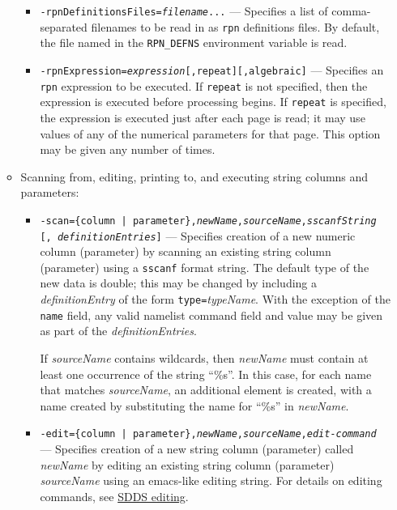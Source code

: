 \begin{itemize}
\begin{itemize}
        \begin{itemize} \item {\tt -rpnDefinitionsFiles={\em filename}...} --- Specifies a list of comma-separated
filenames to be read in as \verb|rpn| definitions files.  By default, the file named in the {\tt RPN\_DEFNS}
environment variable is read.

        \item {\tt -rpnExpression={\em expression}[,repeat][,algebraic]} --- Specifies an \verb|rpn| expression to be executed.  If
{\tt repeat} is not specified, then the expression is executed before processing begins.  If {\tt repeat} is specified,
the expression is executed just after each page is read; it may use values of any of the numerical parameters for that
page. This option may be given any number of times.

        \end{itemize}
  \item Scanning from, editing, printing to, and executing string columns and parameters: \\

         \begin{itemize}
 
         \item {\tt -scan=\{column | parameter\},{\em newName},{\em sourceName},{\em sscanfString}}\\ {\tt [,{\em
 definitionEntries}]} --- Specifies creation of a new numeric column (parameter) by scanning an existing string column
 (parameter) using a \verb|sscanf| format string.  The default type of the new data is double; this may be changed by
 including a {\em definitionEntry} of the form {\tt type=}{\em typeName}.  With the exception of the {\tt name} field,
 any valid namelist command field and value may be given as part of the {\em definitionEntries}.

        If {\em sourceName} contains wildcards, then {\em newName} must contain at least one occurrence of the string
``\%s''.  In this case, for each name that matches {\em sourceName}, an additional element is created, with a
name created by substituting the name for ``\%s'' in {\em newName}.
 
         \item {\tt -edit=\{column | parameter\},{\em newName},{\em sourceName},{\em edit-command}} --- Specifies
creation of a new string column (parameter) called {\em newName} by editing an existing string column (parameter) {\em
sourceName} using an emacs-like editing string.  For details on editing commands, see \hyperref{SDDS editing}{SDDS
editing (see }{)}{SDDS editing}.
         

\end{itemize}
\end{itemize}
\end{itemize}
